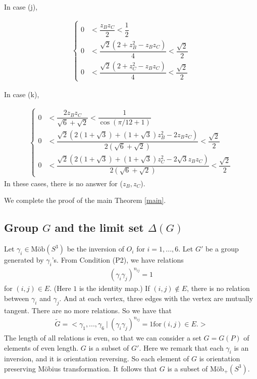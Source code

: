 \documentclass[suppldata, dvipdfmx]{interact}
\theoremstyle{plain}%
\theoremstyle{definition}
\theoremstyle{remark}
\theoremstyle{problemstyle}
\begin{document}
In case (j),

\begin{align*}
 \begin{cases}
  0 &< \dfrac{z_Bz_C}{2} < \dfrac{1}{2}\\
  0 &< \dfrac{\sqrt{2}(2 + z^2_B - z_B z_C)}{4} < \dfrac{\sqrt{2}}{2}\\
  0 &< \dfrac{\sqrt{2}(2 + z^2_C - z_B z_C)}{4} < \dfrac{\sqrt{2}}{2}
 \end{cases}
\end{align*}

In case (k),

\begin{align*}
 \begin{cases}
  0 &< \dfrac{2z_Bz_C}{\sqrt{6} + \sqrt{2}} < \dfrac{1}{\cos(\pi/12+1)}\\
  0 &< \dfrac{\sqrt{2}(2 (1 + \sqrt{3}) + (1 + \sqrt{3})z^2_B -2z_Bz_C)}
  {2(\sqrt{6} + \sqrt{2})} < \dfrac{\sqrt{2}}{2}\\
  0 &< \dfrac{\sqrt{2}(2 (1 + \sqrt{3}) + (1 + \sqrt{3})z^2_C
  -2\sqrt{3}z_Bz_C)}
  {2(\sqrt{6} + \sqrt{2})} < \dfrac{\sqrt{2}}{2}
 \end{cases}
\end{align*}
In these cases, there is no answer for ($z_B, z_C$).

We complete the proof of the main Theorem \ref{main}.

\subsection{Group $G$ and the limit set $\Delta(G)$}
Let $\gamma_i \in \text{M\"ob}(S^3)$ be the inversion of $O_i$ for $i =
1,...,6$.
Let $G'$ be a group generated by $\gamma_i$'s. From Condition (P2), we
have relations
\begin{align*}
 (\gamma_i \gamma_j)^{n_{ij}} = 1
\end{align*}
for $(i, j) \in E.$ (Here $1$ is the identity map.) If $(i, j) \notin E$,
there is no relation between $\gamma_i$ and $\gamma_j$.
And at each vertex, three edges with the vertex are mutually tangent.
There are no more relations. So we have that
\begin{align*}
 \tilde G = <\gamma_1, ...,\gamma_6~|~(\gamma_i\gamma_j)^{n_{ij}} = 1 \text{for}
 (i, j) \in E.>
\end{align*}
The length of all relations is even, so that we can consider a set $G = G(P)$
of elements of even length. $G$ is a subset of $G'$. Here we remark
that each $\gamma_i$ is an inversion, and it is orientation reversing. So
each element of $G$ is orientation preserving M\"obius transformation.
It follows that $G$ is a subset of M\"ob$_+(S^3)$.
\end{document}
